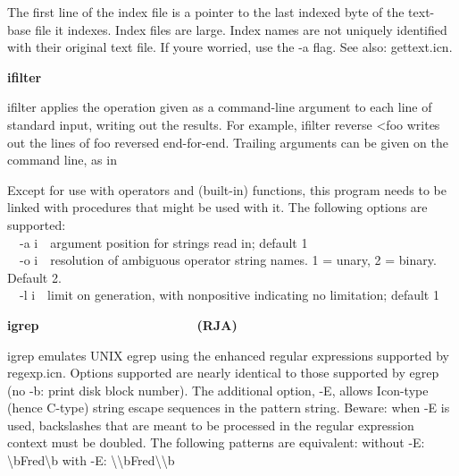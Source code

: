 {

The first line of the index file is a pointer to the last indexed byte
of the text-base file it indexes. Index files are large. Index names
are not uniquely identified with their original text file. If
you{\textquotesingle}re worried, use the \textsf{{}-a} flag. See also:
\textsf{gettext.icn}. 

{\sffamily\bfseries
ifilter\ \ \ \ \ \ \ \ \ \ \ \ \ \ \ \ \ \ \ \ \ \ }

\textsf{ifilter} applies the operation given as a command-line argument
to each line of standard input, writing out the results. For example,
\textsf{ifilter reverse {\textless}foo} writes out the lines of foo
reversed end-for-end. Trailing arguments can be given on the command
line, as in



Except for use with operators and (built-in) functions, this program
needs to be linked with procedures that might be used with it. The
following options are supported:\\
\textsf{\ \ {}-a i}\ \ argument position for strings read in; default
1\\
\ \ \textsf{{}-o i}\ \ resolution of ambiguous operator string names. 1
= unary, 2 = binary. Default 2.\\
\ \ \textsf{{}-l i}\ \ limit on generation, with nonpositive indicating
no limitation; default 1

{\sffamily\bfseries
igrep\ \ \ \ \ \ \ \ \ \ \ \ \ \ \ \ \ \ \ \ \ \ (RJA)}

\textsf{i}\textsf{grep} emulates UNIX egrep using the
enhanced regular expressions supported by \textsf{regexp.icn}. Options
supported are nearly identical to those supported by egrep (no -b:
print disk block number). The additional option, -E, allows Icon-type
(hence C-type) string escape sequences in the pattern string. Beware:
when -E is used, backslashes that are meant to be processed in the
regular expression context must be doubled. The following patterns are
equivalent: without -E:
{\textquotesingle}{\textbackslash}bFred{\textbackslash}b{\textquotesingle}
with -E:
{\textquotesingle}{\textbackslash}{\textbackslash}bFred{\textbackslash}{\textbackslash}b{\textquotesingle}


}

